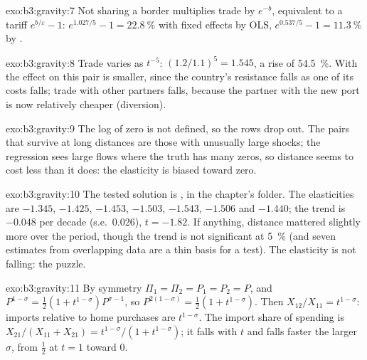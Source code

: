\begin{solution}{exo:b3:gravity:7}
Not sharing a border multiplies trade by $e^{-b}$, equivalent to a tariff $e^{b/\varepsilon} - 1$:
$e^{1.027/5} - 1 = 22.8~\%$ with fixed effects by OLS, $e^{0.537/5} - 1 = 11.3~\%$ by .
\end{solution}

\begin{solution}{exo:b3:gravity:8}
Trade varies as $t^{-5}$: $(1.2/1.1)^5 = 1.545$, a rise of 54.5~\%. With  the effect on this pair is smaller, since the country's resistance
falls as one of its costs falls; trade with other partners falls, because the
partner with the new port is now relatively cheaper (diversion).
\end{solution}

\begin{solution}{exo:b3:gravity:9}
The log of zero is not defined, so the rows drop out. The pairs that survive at
long distances are those with unusually large shocks; the regression sees
large flows where the truth has many zeros, so distance seems to cost less than
it does: the elasticity is biased toward zero.
\end{solution}

\begin{solution}{exo:b3:gravity:10}
The tested solution is , in the chapter's
 folder. The elasticities are $-1.345$, $-1.425$, $-1.453$, $-1.503$,
$-1.543$, $-1.506$ and $-1.440$; the trend is $-0.048$ per decade (s.e.\ 0.026), $t = -1.82$.
If anything, distance mattered slightly more over the period, though the trend is
not significant at 5~\% (and seven estimates from overlapping data are a thin basis
for a test). The elasticity is not falling: the puzzle.
\end{solution}

\begin{solution}{exo:b3:gravity:11}
By symmetry $\Pi_1 = \Pi_2 = P_1 = P_2 = P$, and $P^{1-\sigma} = \tfrac12(1 + t^{1-\sigma})P^{\sigma - 1}$, so
$P^{2(1-\sigma)} = \tfrac12(1 + t^{1-\sigma})$. Then $X_{12}/X_{11} = t^{1-\sigma}$: imports relative to home
purchases are $t^{1-\sigma}$. The import share of spending is $X_{21}/(X_{11} + X_{21}) = t^{1-\sigma}/(1
+ t^{1-\sigma})$; it falls with $t$ and falls faster the larger $\sigma$, from $\tfrac12$ at $t = 1$
toward 0.
\end{solution}

